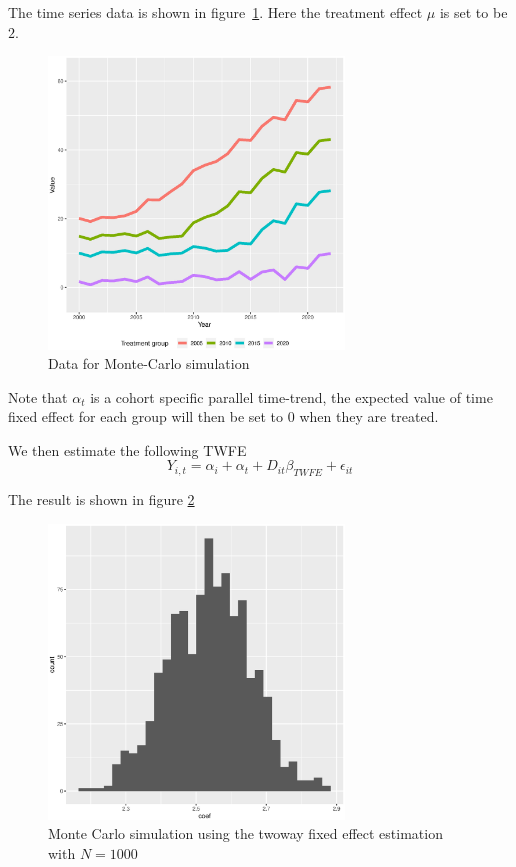The time series data is shown in figure~\ref{fig:mc_result}. Here the treatment effect $\mu$ is set to be $2$.

\begin{figure}[t]
    \centering
    \includegraphics[width = 0.7\textwidth]{fig/sim_twfe.eps}
    \caption{Data for Monte-Carlo simulation }
    \label{fig:mc_result}
\end{figure}

Note that $ \alpha_t$ is a cohort specific parallel time-trend, 
the expected value of time fixed effect for each group will then be set to 0 when they are treated. 

We then estimate the following TWFE
\begin{equation*}
    Y_{i,t} = \alpha_i + \alpha_t + D_{it}\beta_{TWFE} + \epsilon_{it}
\end{equation*}

The result is shown in figure \ref{fig:TWFE_coef}
\begin{figure}
    \centering
    \includegraphics[width = 0.7\textwidth]{fig/monte_sim.eps}
    \caption{Monte Carlo simulation using the twoway fixed effect estimation with $N=1000$}
    \label{fig:TWFE_coef}
\end{figure}

